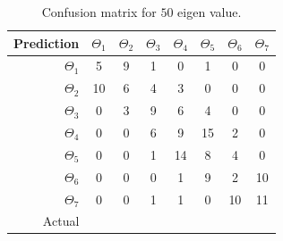 \documentclass[runningheads,a4paper]{llncs}
\begin{document}
\begin{table}
\centering
\caption{Confusion matrix for $50$ eigen value.}
\label{tab:conf50}
\begin{tabular}{@{}r|ccccccc@{}}
\toprule
Prediction & \multicolumn{1}{r}{$\Theta_1$} & \multicolumn{1}{r}{$\Theta_2$} & \multicolumn{1}{r}{$\Theta_3$} & \multicolumn{1}{r}{$\Theta_4$} & \multicolumn{1}{r}{$\Theta_5$} & \multicolumn{1}{r}{$\Theta_6$} & \multicolumn{1}{r}{$\Theta_7$} \\ \midrule
$\Theta_1$ & 5                              & 9                              & 1                              & 0                              & 1                              & 0                              & 0                              \\
$\Theta_2$ & 10                             & 6                              & 4                              & 3                              & 0                              & 0                              & 0                              \\
$\Theta_3$ & 0                              & 3                              & 9                              & 6                              & 4                              & 0                              & 0                              \\
$\Theta_4$ & 0                              & 0                              & 6                              & 9                              & 15                             & 2                              & 0                              \\
$\Theta_5$ & 0                              & 0                              & 1                              & 14                             & 8                              & 4                              & 0                              \\
$\Theta_6$ & 0                              & 0                              & 0                              & 1                              & 9                              & 2                              & 10                             \\
$\Theta_7$ & 0                              & 0                              & 1                              & 1                              & 0                              & 10                             & 11                             \\ \midrule
Actual     & \multicolumn{1}{l}{}           & \multicolumn{1}{l}{}           & \multicolumn{1}{l}{}           & \multicolumn{1}{l}{}           & \multicolumn{1}{l}{}           & \multicolumn{1}{l}{}           & \multicolumn{1}{l}{}           \\ \cmidrule(r){1-1}
\end{tabular}
\end{table}
\end{document}

